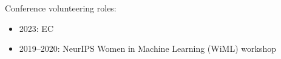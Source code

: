 \documentclass{article}
\newcommand{\heading}[1]
{
	\vspace{3pt}
	{\bf #1} 
	\vspace{-6pt}
	
	\rule{\linewidth}{0.4pt}
}
\begin{document}
Conference volunteering roles:
\begin{itemize}
    \item 2023: EC
	\item 2019--2020: NeurIPS Women in Machine Learning (WiML) workshop
\end{itemize}
\clearpage

\end{document}
